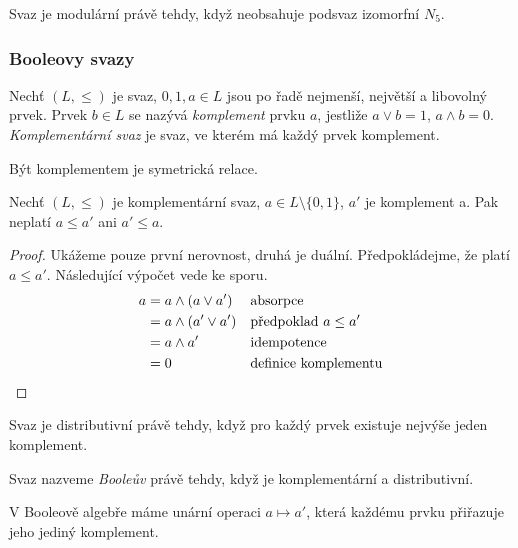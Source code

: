 \begin{claim}
    Svaz je modulární právě tehdy, když neobsahuje podsvaz izomorfní
    $N_5$.
\end{claim}

\subsubsection{Booleovy svazy}

\begin{definition}
Nechť $(L, \leq)$ je svaz, $0, 1, a \in L$ jsou po řadě nejmenší, největší a libovolný prvek.
Prvek $b \in L$ se nazývá {\em komplement} prvku $a$, jestliže
$a \vee b = 1$, $a \wedge b = 0$.
{\em Komplementární svaz} je svaz, ve kterém má každý prvek komplement.
\end{definition}

Být komplementem je symetrická relace.

\begin{claim}
    \label{complements_incomparable}
    Nechť $(L, \leq)$ je komplementární svaz, $a \in L \setminus
    \{0,1\}$, $a'$ je komplement a.
    Pak neplatí $a \leq a'$ ani $a' \leq a$.
\end{claim}
\begin{proof}
    Ukážeme pouze první nerovnost, druhá je duální.
    Předpokládejme, že platí $a \leq a'$. Následující výpočet vede ke
    sporu.
\begin{align*}
    a &= a \wedge (a \vee a')  && \text{absorpce}\\
      &= a \wedge (a' \vee a') && \text{předpoklad } a \leq a'\\
      &= a \wedge a' && \text{idempotence}\\
      &= 0 && \text{definice komplementu}
\qedhere
\end{align*}
\end{proof}

\begin{claim}
    Svaz je distributivní právě tehdy, když
    pro každý prvek existuje nejvýše jeden komplement.
\end{claim}

\begin{definition}
    Svaz nazveme {\em Booleův} právě tehdy, když je komplementární a
    distributivní.
\end{definition}

\begin{corollary}
V Booleově algebře máme unární operaci $a \mapsto a'$, která každému
prvku přiřazuje jeho jediný komplement.
\end{corollary}

